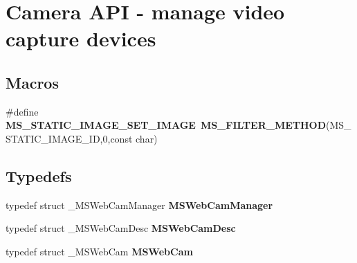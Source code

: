 \section{Camera A\-P\-I -\/ manage video capture devices}
\label{group__mediastreamer2__webcam}
\subsection*{Macros}
\begin{DoxyCompactItemize}
\item 
\#define {\bf M\-S\-\_\-\-S\-T\-A\-T\-I\-C\-\_\-\-I\-M\-A\-G\-E\-\_\-\-S\-E\-T\-\_\-\-I\-M\-A\-G\-E}~{\bf M\-S\-\_\-\-F\-I\-L\-T\-E\-R\-\_\-\-M\-E\-T\-H\-O\-D}(M\-S\-\_\-\-S\-T\-A\-T\-I\-C\-\_\-\-I\-M\-A\-G\-E\-\_\-\-I\-D,0,const char)
\end{DoxyCompactItemize}
\subsection*{Typedefs}
\begin{DoxyCompactItemize}
\item 
typedef struct \-\_\-\-M\-S\-Web\-Cam\-Manager {\bf M\-S\-Web\-Cam\-Manager}
\item 
typedef struct \-\_\-\-M\-S\-Web\-Cam\-Desc {\bf M\-S\-Web\-Cam\-Desc}
\item 
typedef struct \-\_\-\-M\-S\-Web\-Cam {\bf M\-S\-Web\-Cam}
\end{DoxyCompactItemize}
